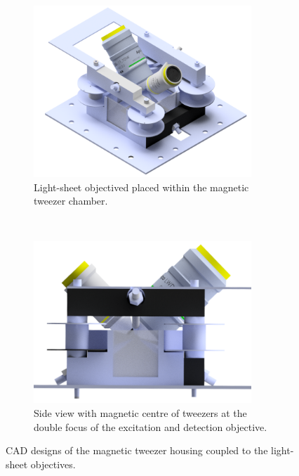 \begin{figure}[t!]
    \centering
    \begin{subfigure}[t]{0.45\textwidth}
        \centering
        \includegraphics[width=0.9\textwidth]{Chapters/tweezers/Figs/Raster/tweezer_spim_render_shooped}
        \caption{Light-sheet objectived placed within the magnetic tweezer chamber.}
    \end{subfigure}%
    ~
    \begin{subfigure}[t]{0.45\textwidth}
        \centering
        \includegraphics[width=0.9\textwidth]{Chapters/tweezers/Figs/Raster/tweezer_spim_render_side}
        \caption{Side view with magnetic centre of tweezers at the double focus of the excitation and detection objective.}
    \end{subfigure}
    \caption{CAD designs of the magnetic tweezer housing coupled to the light-sheet objectives.}
\end{figure}
